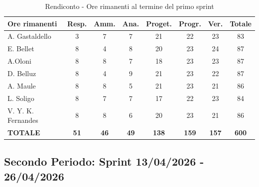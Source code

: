 \documentclass[a4paper,12pt]{article}
\begin{document}
\begin{table}[htbp]
\centering
\renewcommand{\arraystretch}{1.5} 
\begin{tabularx}{\textwidth}{|X|c|c|c|c|c|c|c|}
\hline
\textbf{Ore rimanenti} & \textbf{Resp.} & \textbf{Amm.} & \textbf{Ana.} & \textbf{Proget.} & \textbf{Progr.} & \textbf{Ver.} & \textbf{Totale} \\
\hline
A. Gastaldello & 3 & 7 & 7 & 21 & 22 & 23 & 83 \\
\hline
E. Bellet & 8 & 4 & 8 & 20 & 23 & 24 & 87 \\
\hline
A.Oloni & 8 & 8 & 7 & 18 & 23 & 23 & 87 \\
\hline
D. Belluz & 8 & 4 & 9 & 21 & 23 & 22 & 87 \\
\hline
A. Maule & 8 & 8 & 5 & 21 & 23 & 21 & 86 \\
\hline
L. Soligo & 8 & 7 & 7 & 17 & 22 & 23 & 84 \\
\hline
V. Y. K. Fernandes & 8 & 8 & 6 & 20 & 23 & 21 & 86 \\
\hline
\rowcolor{gray!20}
\textbf{TOTALE} & \textbf{51} & \textbf{46} & \textbf{49} & \textbf{138} & \textbf{159} & \textbf{157} & \textbf{600} \\
\hline
\end{tabularx}
\caption{Rendiconto - Ore rimanenti al termine del primo sprint}
\end{table}

\newpage
\subsection{Secondo Periodo: Sprint 13/04/2026 - 26/04/2026}
\label{sec:pec_secondoperiodo}

\vspace{0.5em}
\end{document}
